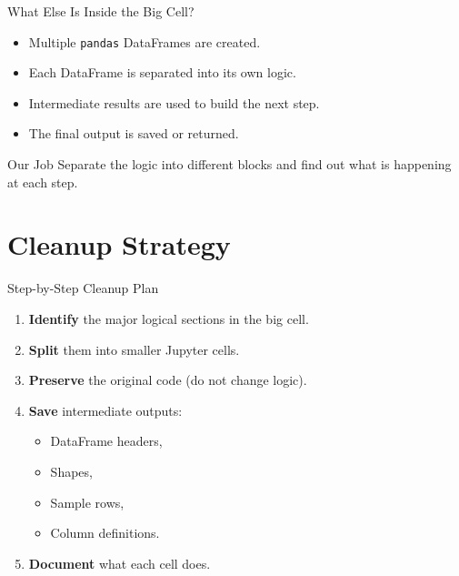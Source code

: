 \documentclass[aspectratio=169,11pt]{beamer}
\begin{document}
	\begin{frame}{What Else Is Inside the Big Cell?}
		\begin{itemize}
			\item Multiple \texttt{pandas} DataFrames are created.
			\item Each DataFrame is separated into its own logic.
			\item Intermediate results are used to build the next step.
			\item The final output is saved or returned.
		\end{itemize}
		
		\begin{alertblock}{Our Job}
			Separate the logic into different blocks and find out what is happening at each step.
		\end{alertblock}
	\end{frame}
	
	\section{Cleanup Strategy}
	
	\begin{frame}{Step-by-Step Cleanup Plan}
		\begin{enumerate}
			\item \textbf{Identify} the major logical sections in the big cell.
			\item \textbf{Split} them into smaller Jupyter cells.
			\item \textbf{Preserve} the original code (do not change logic).
			\item \textbf{Save} intermediate outputs:
			\begin{itemize}
				\item DataFrame headers,
				\item Shapes,
				\item Sample rows,
				\item Column definitions.
			\end{itemize}
			\item \textbf{Document} what each cell does.
		\end{enumerate}
	\end{frame}
	
\end{document}
